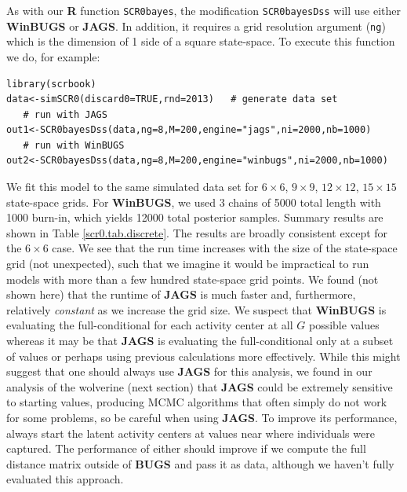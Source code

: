 As with our {\bf R} function \mbox{\tt SCR0bayes}, the modification
\mbox{\tt SCR0bayesDss} will use either {\bf WinBUGS} or {\bf
  JAGS}. In addition, it requires a grid resolution argument
(\mbox{\tt ng}) which is the dimension of 1 side of a square state-space.
To execute this function we do, for example:
{\small
\begin{verbatim}
library(scrbook)
data<-simSCR0(discard0=TRUE,rnd=2013)   # generate data set
   # run with JAGS
out1<-SCR0bayesDss(data,ng=8,M=200,engine="jags",ni=2000,nb=1000)
   # run with WinBUGS
out2<-SCR0bayesDss(data,ng=8,M=200,engine="winbugs",ni=2000,nb=1000)
\end{verbatim}
}
We fit this model to the same simulated data set for $6 \times 6$,
$9 \times 9$, $12 \times 12$, $15\times 15$ state-space grids.  For
{\bf WinBUGS}, we used 3 chains of 5000 total length with 1000
burn-in, which yields 12000 total posterior samples.  Summary results
are shown in Table \ref{scr0.tab.discrete}.  The results are broadly
consistent except for the $6\times 6$ case.  We see that the run time
increases with the size of the state-space grid (not unexpected), such
that we imagine it would be impractical to run models with more than a
few hundred state-space grid points.  We found (not shown here) that
the runtime of {\bf JAGS} is much faster and, furthermore, relatively
{\it constant} as we increase the grid size.  We suspect that {\bf
  WinBUGS} is evaluating the full-conditional for each activity center
at all $G$ possible values whereas it may be that {\bf JAGS} is
evaluating the full-conditional only at a subset of values or perhaps
using previous calculations more effectively.  While this might
suggest that one should always use {\bf JAGS} for this analysis, we
found in our analysis of the wolverine (next section) that {\bf JAGS}
could be extremely sensitive to starting values, producing MCMC
algorithms that often simply do not work for some problems, so be
careful when using {\bf JAGS}. To improve its performance, always
start the latent activity centers at values near where individuals
were captured.
The performance of either should improve if we compute the full
distance matrix outside of {\bf BUGS} and pass it as data, although we
haven't fully evaluated this approach.



